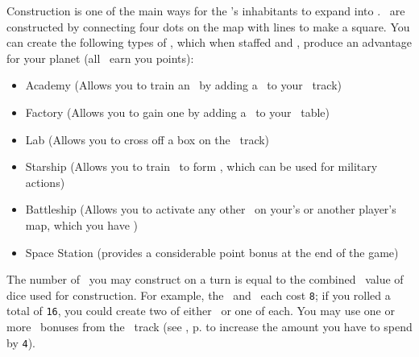 Construction is one of the main ways for the \planet's inhabitants to expand 
into \outerspace. \armaments\ are constructed by connecting four dots on the map
with lines to make a square.
\newline\newline
You can create the following types of \armaments, which when staffed and 
\activated, produce an advantage for your planet (all \armaments\ earn you 
points):
\begin{itemize}
  \item Academy (Allows you to train an \astronaut\ by adding a 
        \gainastronautsymbol\ to your \population\ track)
  \item Factory (Allows you to gain one \currency by adding a \gaincurrency\ to 
        your \currency\ table)
  \item Lab (Allows you to cross off a box on the \tech\ track)
  \item Starship (Allows you to train \astronauts\ to form \squadrons, which can
         be used for military actions)
  \item Battleship (Allows you to activate any other \armaments\ on your's or 
        another player's map, which you have \reach)
  \item Space Station (provides a considerable point bonus at the end of the 
        game)
\end{itemize}
The number of \armaments\ you may construct on a turn is equal to the combined \
value of dice used for construction.  For example, the \academy\ and \factory\ 
each cost \texttt{8}; if you rolled a total of \texttt{16}, you could create two
 of either \armaments\ or one of each.  You may use one or more \greatperson\ 
 bonuses from the \population\ track (see , 
 p.\pageref{sec:population} to increase the amount you have to spend by 
 \texttt{4}).
